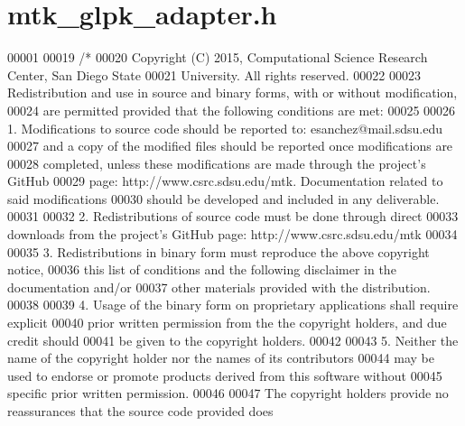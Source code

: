 \hypertarget{mtk__glpk__adapter_8h_source}{\section{mtk\+\_\+glpk\+\_\+adapter.\+h}
\label{mtk__glpk__adapter_8h_source}
}

\begin{DoxyCode}
00001 
00019 \textcolor{comment}{/*}
00020 \textcolor{comment}{Copyright (C) 2015, Computational Science Research Center, San Diego State}
00021 \textcolor{comment}{University. All rights reserved.}
00022 \textcolor{comment}{}
00023 \textcolor{comment}{Redistribution and use in source and binary forms, with or without modification,}
00024 \textcolor{comment}{are permitted provided that the following conditions are met:}
00025 \textcolor{comment}{}
00026 \textcolor{comment}{1. Modifications to source code should be reported to: esanchez@mail.sdsu.edu}
00027 \textcolor{comment}{and a copy of the modified files should be reported once modifications are}
00028 \textcolor{comment}{completed, unless these modifications are made through the project's GitHub}
00029 \textcolor{comment}{page: http://www.csrc.sdsu.edu/mtk. Documentation related to said modifications}
00030 \textcolor{comment}{should be developed and included in any deliverable.}
00031 \textcolor{comment}{}
00032 \textcolor{comment}{2. Redistributions of source code must be done through direct}
00033 \textcolor{comment}{downloads from the project's GitHub page: http://www.csrc.sdsu.edu/mtk}
00034 \textcolor{comment}{}
00035 \textcolor{comment}{3. Redistributions in binary form must reproduce the above copyright notice,}
00036 \textcolor{comment}{this list of conditions and the following disclaimer in the documentation and/or}
00037 \textcolor{comment}{other materials provided with the distribution.}
00038 \textcolor{comment}{}
00039 \textcolor{comment}{4. Usage of the binary form on proprietary applications shall require explicit}
00040 \textcolor{comment}{prior written permission from the the copyright holders, and due credit should}
00041 \textcolor{comment}{be given to the copyright holders.}
00042 \textcolor{comment}{}
00043 \textcolor{comment}{5. Neither the name of the copyright holder nor the names of its contributors}
00044 \textcolor{comment}{may be used to endorse or promote products derived from this software without}
00045 \textcolor{comment}{specific prior written permission.}
00046 \textcolor{comment}{}
00047 \textcolor{comment}{The copyright holders provide no reassurances that the source code provided does}

\end{DoxyCode}
